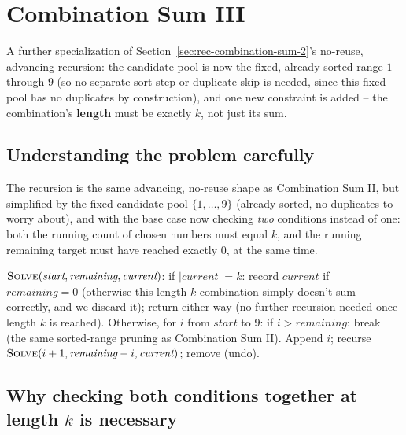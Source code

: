 \section{Combination Sum III}
\label{sec:rec-combination-sum-3}


\begin{patternbox}
A further specialization of Section~\ref{sec:rec-combination-sum-2}'s
no-reuse, advancing recursion: the candidate pool is now the fixed,
already-sorted range $1$ through $9$ (so no separate sort step or
duplicate-skip is needed, since this fixed pool has no duplicates by
construction), and one new constraint is added -- the combination's
\textbf{length} must be exactly $k$, not just its sum.
\end{patternbox}

\subsection*{Understanding the problem carefully}

The recursion is the same advancing, no-reuse shape as Combination Sum
II, but simplified by the fixed candidate pool $\{1,\dots,9\}$ (already
sorted, no duplicates to worry about), and with the base case now
checking \emph{two} conditions instead of one: both the running count of
chosen numbers must equal $k$, and the running remaining target must
have reached exactly $0$, at the same time.

\begin{ideabox}
$\textsc{Solve}(\textit{start}, \textit{remaining}, \textit{current})$:
if $|\textit{current}| = k$: record $\textit{current}$ if
$\textit{remaining}=0$ (otherwise this length-$k$ combination simply
doesn't sum correctly, and we discard it); return either way (no further
recursion needed once length $k$ is reached). Otherwise, for $i$ from
$\textit{start}$ to $9$: if $i > \textit{remaining}$: break (the same
sorted-range pruning as Combination Sum II). Append $i$; recurse
$\textsc{Solve}(i+1, \textit{remaining}-i, \textit{current})$; remove
(undo).
\end{ideabox}

\subsection*{Why checking both conditions together at length $k$ is necessary}

